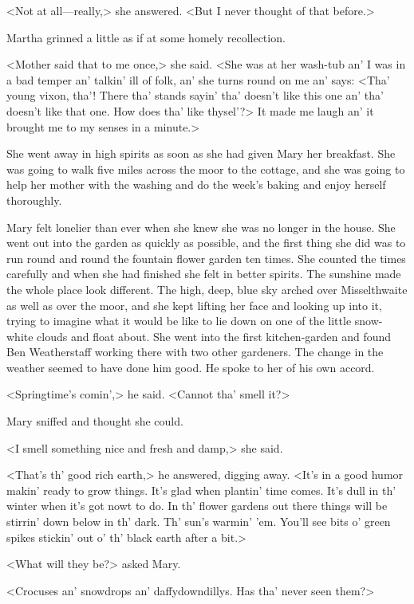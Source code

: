 <Not at all—really,> she answered. <But I never thought of that before.>

Martha grinned a little as if at some homely recollection.

<Mother said that to me once,> she said. <She was at her wash-tub an' I was in a bad temper an' talkin' ill of folk, an' she turns round on me an' says: <Tha' young vixon, tha'! There tha' stands sayin' tha' doesn't like this one an' tha' doesn't like that one. How does tha' like thysel'?> It made me laugh an' it brought me to my senses in a minute.>

She went away in high spirits as soon as she had given Mary her breakfast. She was going to walk five miles across the moor to the cottage, and she was going to help her mother with the washing and do the week's baking and enjoy herself thoroughly.

Mary felt lonelier than ever when she knew she was no longer in the house. She went out into the garden as quickly as possible, and the first thing she did was to run round and round the fountain flower garden ten times. She counted the times carefully and when she had finished she felt in better spirits. The sunshine made the whole place look different. The high, deep, blue sky arched over Misselthwaite as well as over the moor, and she kept lifting her face and looking up into it, trying to imagine what it would be like to lie down on one of the little snow-white clouds and float about. She went into the first kitchen-garden and found Ben Weatherstaff working there with two other gardeners. The change in the weather seemed to have done him good. He spoke to her of his own accord.

<Springtime's comin',> he said. <Cannot tha' smell it?>

Mary sniffed and thought she could.

<I smell something nice and fresh and damp,> she said.

<That's th' good rich earth,> he answered, digging away. <It's in a good humor makin' ready to grow things. It's glad when plantin' time comes. It's dull in th' winter when it's got nowt to do. In th' flower gardens out there things will be stirrin' down below in th' dark. Th' sun's warmin' 'em. You'll see bits o' green spikes stickin' out o' th' black earth after a bit.>

<What will they be?> asked Mary.

<Crocuses an' snowdrops an' daffydowndillys. Has tha' never seen them?>

